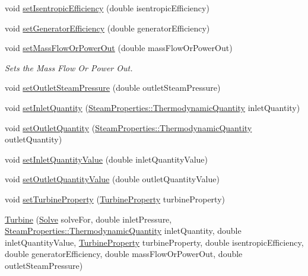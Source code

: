 \begin{DoxyCompactItemize}
\item 
void \hyperlink{class_turbine_ae67daa481ef48bcf8aef84bcccb4611d}{set\+Isentropic\+Efficiency} (double isentropic\+Efficiency)
\item 
void \hyperlink{class_turbine_a51e9c5050a5be51b86dc23e690bd3f40}{set\+Generator\+Efficiency} (double generator\+Efficiency)
\item 
void \hyperlink{class_turbine_a73522631e2eeefa8ea14d5b537e3e760}{set\+Mass\+Flow\+Or\+Power\+Out} (double mass\+Flow\+Or\+Power\+Out)
\begin{DoxyCompactList}\small\item\em Sets the Mass Flow Or Power Out. \end{DoxyCompactList}\item 
void \hyperlink{class_turbine_ab9612657de02e4523492b687917b4091}{set\+Outlet\+Steam\+Pressure} (double outlet\+Steam\+Pressure)
\item 
void \hyperlink{class_turbine_aecc05c70870fb11bbc0bb4fe5d8438bd}{set\+Inlet\+Quantity} (\hyperlink{class_steam_properties_ae0294bedf7d178c2d8fb6aed0f62fbff}{Steam\+Properties\+::\+Thermodynamic\+Quantity} inlet\+Quantity)
\item 
void \hyperlink{class_turbine_ad5ff4ba1657aac9519a6841336ec571c}{set\+Outlet\+Quantity} (\hyperlink{class_steam_properties_ae0294bedf7d178c2d8fb6aed0f62fbff}{Steam\+Properties\+::\+Thermodynamic\+Quantity} outlet\+Quantity)
\item 
void \hyperlink{class_turbine_ac01a053462c83e21ecc2158e75477542}{set\+Inlet\+Quantity\+Value} (double inlet\+Quantity\+Value)
\item 
void \hyperlink{class_turbine_ab37326068f633280de8f8144b9c8eb89}{set\+Outlet\+Quantity\+Value} (double outlet\+Quantity\+Value)
\item 
void \hyperlink{class_turbine_abb3f16cefe52f4e9c7b32b2bb17a68ee}{set\+Turbine\+Property} (\hyperlink{class_turbine_a5db4f65cf2539e3837684d53221ade12}{Turbine\+Property} turbine\+Property)
\item 
\hyperlink{class_turbine_a3c3c871b9fe57d48dd06b109794381dc}{Turbine} (\hyperlink{class_turbine_a9fd7beba6c6f071e228fbe3e07969d2b}{Solve} solve\+For, double inlet\+Pressure, \hyperlink{class_steam_properties_ae0294bedf7d178c2d8fb6aed0f62fbff}{Steam\+Properties\+::\+Thermodynamic\+Quantity} inlet\+Quantity, double inlet\+Quantity\+Value, \hyperlink{class_turbine_a5db4f65cf2539e3837684d53221ade12}{Turbine\+Property} turbine\+Property, double isentropic\+Efficiency, double generator\+Efficiency, double mass\+Flow\+Or\+Power\+Out, double outlet\+Steam\+Pressure)

\end{DoxyCompactItemize}

